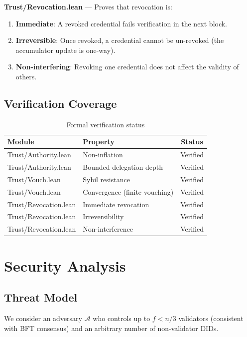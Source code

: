 \documentclass[11pt,letterpaper]{article}
\theoremstyle{definition}
\theoremstyle{remark}
\begin{document}
\textbf{Trust/Revocation.lean} --- Proves that revocation is:
\begin{enumerate}
\item \textbf{Immediate}: A revoked credential fails verification in the next block.
\item \textbf{Irreversible}: Once revoked, a credential cannot be un-revoked (the accumulator update is one-way).
\item \textbf{Non-interfering}: Revoking one credential does not affect the validity of others.
\end{enumerate}

\subsection{Verification Coverage}

\begin{table}[h]
\centering
\begin{tabular}{llc}
\toprule
\textbf{Module} & \textbf{Property} & \textbf{Status} \\
\midrule
Trust/Authority.lean & Non-inflation & Verified \\
Trust/Authority.lean & Bounded delegation depth & Verified \\
Trust/Vouch.lean & Sybil resistance & Verified \\
Trust/Vouch.lean & Convergence (finite vouching) & Verified \\
Trust/Revocation.lean & Immediate revocation & Verified \\
Trust/Revocation.lean & Irreversibility & Verified \\
Trust/Revocation.lean & Non-interference & Verified \\
\bottomrule
\end{tabular}
\caption{Formal verification status}
\label{tab:verification}
\end{table}

\section{Security Analysis}

\subsection{Threat Model}

We consider an adversary $\mathcal{A}$ who controls up to $f < n/3$ validators (consistent with BFT consensus) and an arbitrary number of non-validator DIDs.
\end{document}
